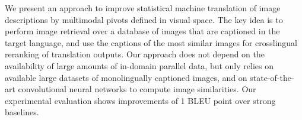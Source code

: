 We present an approach to improve statistical machine translation of image descriptions by multimodal pivots defined in visual space. The key idea is to perform image retrieval over a database of images that are captioned in the target language, and use the captions of the most similar images for crosslingual reranking of translation outputs. Our approach does not depend on the availability of large amounts of in-domain parallel data, but only relies on available large datasets of monolingually captioned images, and on state-of-the-art convolutional neural networks to compute image similarities. Our experimental evaluation shows improvements of 1 BLEU point over strong baselines.
